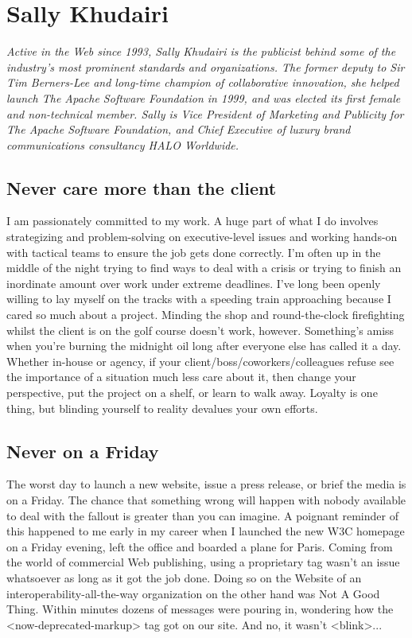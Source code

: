 \chapter{Sally Khudairi}
\textit{Active in the Web since 1993, Sally Khudairi is the publicist behind some of the industry's most prominent standards and organizations. The former deputy to Sir Tim Berners-Lee and long-time champion of collaborative innovation, she helped launch The Apache Software Foundation in 1999, and was elected its first female and non-technical member. Sally is Vice President of Marketing and Publicity for The Apache Software Foundation, and Chief Executive of luxury brand communications consultancy HALO Worldwide.}

\section*{Never care more than the client}
I am passionately committed to my work. A huge part of what I do involves strategizing and problem-solving on executive-level issues and working hands-on with tactical teams to ensure the job gets done correctly. I'm often up in the middle of the night trying to find ways to deal with a crisis or trying to finish an inordinate amount over work under extreme deadlines. I've long been openly willing to lay myself on the tracks with a speeding train approaching because I cared so much about a project. Minding the shop and round-the-clock firefighting whilst the client is on the golf course doesn't work, however. Something's amiss when you're burning the midnight oil long after everyone else has called it a day. Whether in-house or agency, if your client/boss/coworkers/colleagues refuse see the importance of a situation much less care about it, then change your perspective, put the project on a shelf, or learn to walk away. Loyalty is one thing, but blinding yourself to reality devalues your own efforts.

\section*{Never on a Friday}
The worst day to launch a new website, issue a press release, or brief the media is on a Friday. The chance that something wrong will happen with nobody available to deal with the fallout is greater than you can imagine. A poignant reminder of this happened to me early in my career when I launched the new W3C homepage on a Friday evening, left the office and boarded a plane for Paris. Coming from the world of commercial Web publishing, using a proprietary tag wasn't an issue whatsoever as long as it got the job done. Doing so on the Website of an interoperability-all-the-way organization on the other hand was Not A Good Thing. Within minutes dozens of messages were pouring in, wondering how the <now-deprecated-markup> tag got on our site. And no, it wasn't <blink>...

